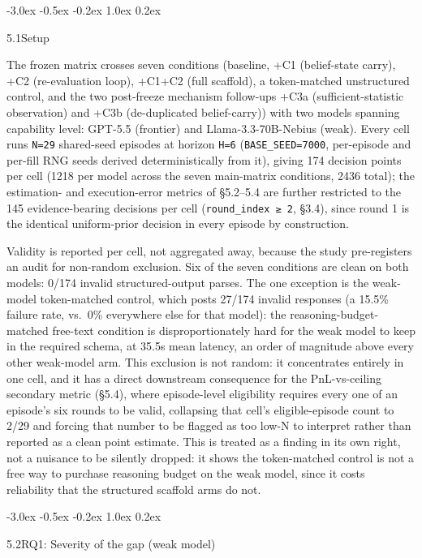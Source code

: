 \documentclass[
  11pt,
]{article}
\makeatletter
\renewcommand{\subsection}{%
  \@startsection{subsection}{2}{\z@}%
                {-3.0ex \@plus -0.5ex \@minus -0.2ex}%
                { 1.0ex \@plus  0.2ex}%
                {\normalsize\bf\raggedright}%
}
\makeatother
\begin{document}
\subsection{5.1\quad Setup}\label{setup}

The frozen matrix crosses seven conditions (baseline, +C1 (belief-state carry), +C2 (re-evaluation loop), +C1+C2 (full scaffold), a token-matched unstructured control, and the two post-freeze mechanism follow-ups +C3a (sufficient-statistic observation) and +C3b (de-duplicated belief-carry)) with two models spanning capability level: GPT-5.5 (frontier) and Llama-3.3-70B-Nebius (weak). Every cell runs \texttt{N=29} shared-seed episodes at horizon \texttt{H=6} (\texttt{BASE\_SEED=7000}, per-episode and per-fill RNG seeds derived deterministically from it), giving 174 decision points per cell (1218 per model across the seven main-matrix conditions, 2436 total); the estimation- and execution-error metrics of §5.2--5.4 are further restricted to the 145 evidence-bearing decisions per cell (\texttt{round\_index\ ≥\ 2}, §3.4), since round 1 is the identical uniform-prior decision in every episode by construction.

Validity is reported per cell, not aggregated away, because the study pre-registers an audit for non-random exclusion. Six of the seven conditions are clean on both models: 0/174 invalid structured-output parses. The one exception is the weak-model token-matched control, which posts 27/174 invalid responses (a 15.5\% failure rate, vs.~0\% everywhere else for that model): the reasoning-budget-matched free-text condition is disproportionately hard for the weak model to keep in the required schema, at 35.5s mean latency, an order of magnitude above every other weak-model arm. This exclusion is not random: it concentrates entirely in one cell, and it has a direct downstream consequence for the PnL-vs-ceiling secondary metric (§5.4), where episode-level eligibility requires every one of an episode's six rounds to be valid, collapsing that cell's eligible-episode count to 2/29 and forcing that number to be flagged as too low-N to interpret rather than reported as a clean point estimate. This is treated as a finding in its own right, not a nuisance to be silently dropped: it shows the token-matched control is not a free way to purchase reasoning budget on the weak model, since it costs reliability that the structured scaffold arms do not.

\subsection{5.2\quad RQ1: Severity of the gap (weak model)}\label{rq1-severity-of-the-gap-weak-model}
\end{document}
